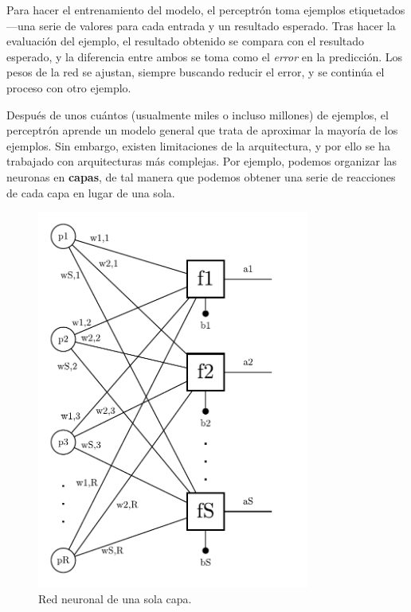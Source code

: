 \documentclass{article}
\begin{document}
Para hacer el entrenamiento del modelo, el perceptrón toma ejemplos etiquetados---una serie de valores para cada entrada y un resultado esperado.
Tras hacer la evaluación del ejemplo, el resultado obtenido se compara con el resultado esperado, y la diferencia entre ambos se toma como el \textit{error} en la predicción.
Los pesos de la red se ajustan, siempre buscando reducir el error, y se continúa el proceso con otro ejemplo.

Después de unos cuántos (usualmente miles o incluso millones) de ejemplos, el perceptrón aprende un modelo general que trata de aproximar la mayoría de los ejemplos. Sin embargo, existen limitaciones de la arquitectura, y por ello se ha trabajado con arquitecturas más complejas.
Por ejemplo, podemos organizar las neuronas en \textbf{capas}, de tal manera que podemos obtener una serie de reacciones de cada capa en lugar de una sola.

\begin{figure}[htbp]
    \centering
    \includegraphics[width=0.8\textwidth]{single-layer-NN.pdf}
    \caption{Red neuronal de una sola capa.}
    \label{fig:single-layer}
\end{figure}
\end{document}
